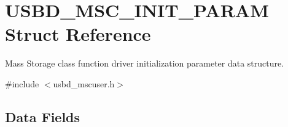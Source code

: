 \hypertarget{structUSBD__MSC__INIT__PARAM}{\section{U\-S\-B\-D\-\_\-\-M\-S\-C\-\_\-\-I\-N\-I\-T\-\_\-\-P\-A\-R\-A\-M Struct Reference}
\label{structUSBD__MSC__INIT__PARAM}
}


Mass Storage class function driver initialization parameter data structure.  




{\ttfamily \#include $<$usbd\-\_\-mscuser.\-h$>$}

\subsection*{Data Fields}
